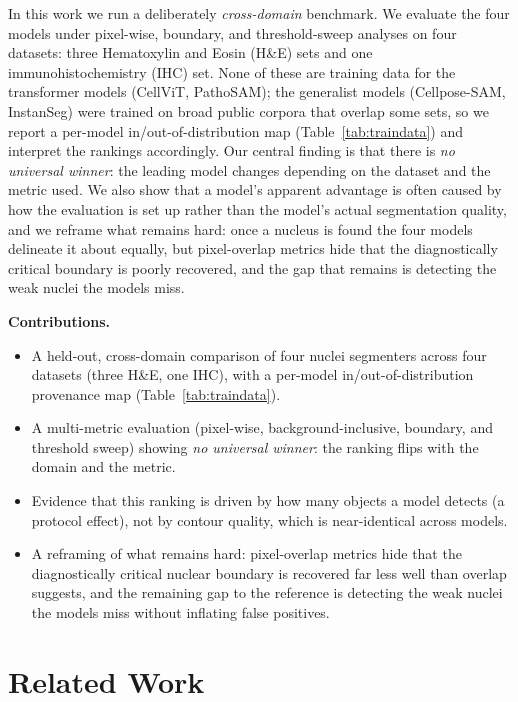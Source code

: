 \documentclass[10pt,conference]{IEEEtran}
\begin{document}
In this work we run a deliberately \emph{cross-domain}
benchmark. We evaluate the four models under pixel-wise, boundary, and
threshold-sweep analyses on four datasets: three Hematoxylin and Eosin (H\&E)
sets and one immunohistochemistry (IHC) set. None of these are training data for the
transformer models (CellViT, PathoSAM); the generalist models (Cellpose-SAM,
InstanSeg) were trained on broad public corpora that overlap some sets, so we
report a per-model in/out-of-distribution map (Table~\ref{tab:traindata}) and
interpret the rankings accordingly. Our central
finding is that there is \emph{no universal winner}: the leading model changes
depending on the dataset and the metric used. We also show that a model's apparent
advantage is often caused by how the evaluation is set up rather than the model's actual
segmentation quality, and we reframe what remains hard: once a nucleus is found the four
models delineate it about equally, but pixel-overlap metrics hide that the diagnostically
critical boundary is poorly recovered, and the gap that remains is detecting the weak nuclei
the models miss.

\textbf{Contributions.}
\begin{itemize}
  \item A held-out, cross-domain comparison of four nuclei segmenters across four
        datasets (three H\&E, one IHC), with a per-model in/out-of-distribution
        provenance map (Table~\ref{tab:traindata}).
  \item A multi-metric evaluation (pixel-wise, background-inclusive, boundary,
        and threshold sweep) showing \emph{no universal winner}: the ranking flips
        with the domain and the metric.
  \item Evidence that this ranking is driven by how many objects a model detects
        (a protocol effect), not by contour quality, which is near-identical across models.
  \item A reframing of what remains hard: pixel-overlap metrics hide that the
        diagnostically critical nuclear boundary is recovered far less well than overlap
        suggests, and the remaining gap to the reference is detecting the weak nuclei the
        models miss without inflating false positives.
\end{itemize}

\section{Related Work}
\label{sec:related}
\end{document}
